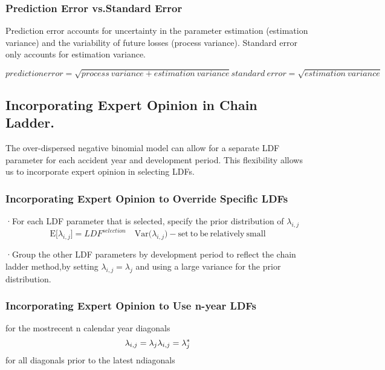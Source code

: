 \documentclass[
]{article}
\begin{document}
\subsubsection{Prediction Error vs.Standard
Error}\label{prediction-error-vs.standard-error}

Prediction error accounts for uncertainty in the parameter estimation
(estimation variance) and the variability of future losses (process
variance). Standard error only accounts for estimation variance.

\[predictionerror=\sqrt{process\:variance+estimation\:variance}standard\:error=\sqrt{estimation\:variance}\]

\subsection{Incorporating Expert Opinion in Chain
Ladder.}\label{incorporating-expert-opinion-in-chain-ladder.}

The over-dispersed negative binomial model can allow for a separate LDF
parameter for each accident year and development period. This
flexibility allows us to incorporate expert opinion in selecting LDFs.

\subsubsection{Incorporating Expert Opinion to Override Specific
LDFs}\label{incorporating-expert-opinion-to-override-specific-ldfs}

·For each LDF parameter that is selected, specify the prior distribution
of \(\lambda_{i,j}\)
\[\mathrm{E}\Big[\lambda_{i,j}\Big]=LDF^{selection}\quad\mathrm{Var}\Big(\lambda_{i,j}\Big)-\mathrm{set~to~be~relatively~small}\]

·Group the other LDF parameters by development period to reflect the
chain ladder method,by setting \(\lambda_{i,j}=\lambda_{j}\) and using a
large variance for the prior distribution.

\subsubsection{Incorporating Expert Opinion to Use n-year
LDFs}\label{incorporating-expert-opinion-to-use-n-year-ldfs}

for the mostrecent n calendar year diagonals
\[\lambda_{i,j}=\lambda_{j}\\\lambda_{i,j}=\lambda_{j}^{*}\] for all
diagonals prior to the latest ndiagonals
\end{document}
